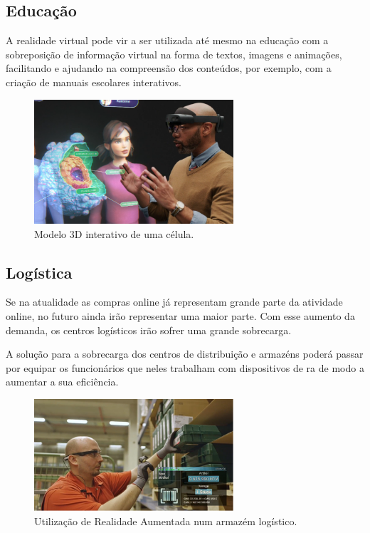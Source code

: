 \documentclass{report}
\begin{document}
\subsection{Educação}
A realidade virtual pode vir a ser utilizada até mesmo na educação com a sobreposição de informação virtual na forma de textos, imagens e animações, facilitando e ajudando na compreensão dos conteúdos, por exemplo, com a criação de manuais escolares interativos.

\begin{figure}[H]
    \centering
    \includegraphics[width=20em]{education.png}
    \caption{Modelo 3D interativo de uma célula.}
    \label{Fig:education}
\end{figure}

\subsection{Logística}
Se na atualidade as compras online já representam grande parte da atividade online, no futuro ainda irão representar uma maior parte. Com esse aumento da demanda, os centros logísticos irão sofrer uma grande sobrecarga.

A solução para a sobrecarga dos centros de distribuição e armazéns poderá passar por equipar os funcionários que neles trabalham com dispositivos de \ac{ra} de modo a aumentar a sua eficiência.

\begin{figure}[H]
    \centering
    \includegraphics[width=20em]{logistics.png}
    \caption{Utilização de Realidade Aumentada num armazém logístico.}
    \label{Fig:logistics}
\end{figure}
\end{document}
